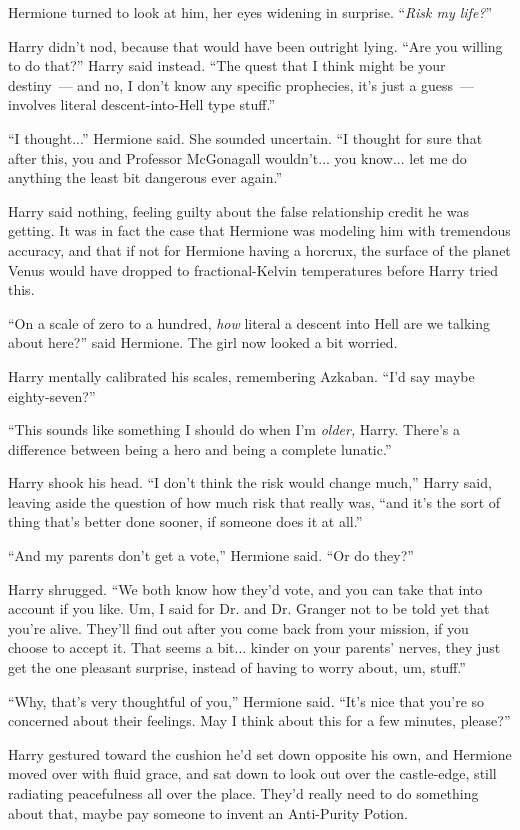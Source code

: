 Hermione turned to look at him, her eyes widening in surprise. ``\emph{Risk my life?}''

Harry didn't nod, because that would have been outright lying. ``Are you willing to do that?'' Harry said instead. ``The quest that I think might be your destiny~--- and no, I don't know any specific prophecies, it's just a guess~--- involves literal descent-into-Hell type stuff.''

``I thought...'' Hermione said. She sounded uncertain. ``I thought for sure that after this, you and Professor McGonagall wouldn't... you know... let me do anything the least bit dangerous ever again.''

Harry said nothing, feeling guilty about the false relationship credit he was getting. It was in fact the case that Hermione was modeling him with tremendous accuracy, and that if not for Hermione having a horcrux, the surface of the planet Venus would have dropped to fractional-Kelvin temperatures before Harry tried this.

``On a scale of zero to a hundred, \emph{how} literal a descent into Hell are we talking about here?'' said Hermione. The girl now looked a bit worried.

Harry mentally calibrated his scales, remembering Azkaban. ``I'd say maybe eighty-seven?''

``This sounds like something I should do when I'm \emph{older,} Harry. There's a difference between being a hero and being a complete lunatic.''

Harry shook his head. ``I don't think the risk would change much,'' Harry said, leaving aside the question of how much risk that really was, ``and it's the sort of thing that's better done sooner, if someone does it at all.''

``And my parents don't get a vote,'' Hermione said. ``Or do they?''

Harry shrugged. ``We both know how they'd vote, and you can take that into account if you like. Um, I said for Dr. and Dr. Granger not to be told yet that you're alive. They'll find out after you come back from your mission, if you choose to accept it. That seems a bit... kinder on your parents' nerves, they just get the one pleasant surprise, instead of having to worry about, um, stuff.''

``Why, that's very thoughtful of you,'' Hermione said. ``It's nice that you're so concerned about their feelings. May I think about this for a few minutes, please?''

Harry gestured toward the cushion he'd set down opposite his own, and Hermione moved over with fluid grace, and sat down to look out over the castle-edge, still radiating peacefulness all over the place. They'd really need to do something about that, maybe pay someone to invent an Anti-Purity Potion.

